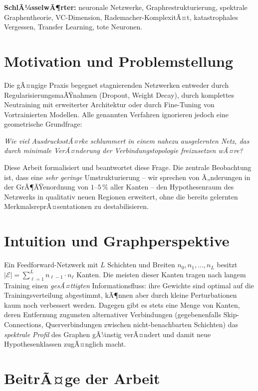 ﻿\documentclass[12pt, a4paper, openany]{report}
\newcommand{\calE}{\mathcal{E}}
\begin{document}
\textbf{SchlÃ¼sselwÃ¶rter:} neuronale Netzwerke, Graphrestrukturierung,
spektrale Graphentheorie, VC-Dimension, Rademacher-KomplexitÃ¤t,
katastrophales Vergessen, Transfer Learning, tote Neuronen.

\section{Motivation und Problemstellung}

Die gÃ¤ngige Praxis begegnet stagnierenden Netzwerken entweder durch
RegularisierungsmaÃŸnahmen (Dropout, Weight Decay), durch komplettes
Neutraining mit erweiterter Architektur oder durch Fine-Tuning von
Vortrainierten Modellen.  Alle genannten Verfahren ignorieren jedoch eine
geometrische Grundfrage:

\begin{center}
\itshape
Wie viel AusdrucksstÃ¤rke schlummert in einem nahezu ausgelernten Netz,
das durch minimale VerÃ¤nderung der Verbindungstopologie freizusetzen wÃ¤re?
\end{center}

Diese Arbeit formalisiert und beantwortet diese Frage.  Die zentrale
Beobachtung ist, dass eine \emph{sehr geringe} Umstrukturierung -- wir
sprechen von Ã„nderungen in der GrÃ¶ÃŸenordnung von $1$--$5\,\%$ aller Kanten --
den Hypothesenraum des Netzwerks in qualitativ neuen Regionen erweitert, ohne
die bereits gelernten MerkmalsreprÃ¤sentationen zu destabilisieren.

\section{Intuition und Graphperspektive}

Ein Feedforward-Netzwerk mit $L$ Schichten und Breiten $n_0, n_1, \ldots, n_L$
besitzt $|\calE| = \sum_{\ell=1}^L n_{\ell-1}\cdot n_\ell$ Kanten.  Die
meisten dieser Kanten tragen nach langem Training einen
\emph{gesÃ¤ttigten} Informationsfluss: ihre Gewichte sind optimal auf die
Trainingsverteilung abgestimmt, kÃ¶nnen aber durch kleine Perturbationen kaum
noch verbessert werden.  Dagegen gibt es stets eine Menge von Kanten, deren
Entfernung zugunsten alternativer Verbindungen (gegebenenfalls Skip-Connections,
Querverbindungen zwischen nicht-benachbarten Schichten) das
\emph{spektrale Profil} des Graphen gÃ¼nstig verÃ¤ndert und damit neue
Hypothesenklassen zugÃ¤nglich macht.

\section{BeitrÃ¤ge der Arbeit}
\end{document}
